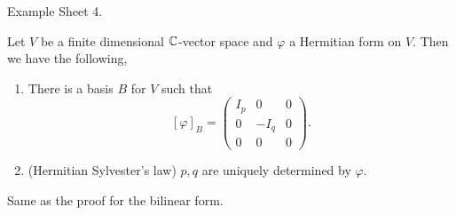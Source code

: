 \documentclass{article}
\begin{document}
\pf Example Sheet 4.
\begin{theorem}
  Let $ V $ be a finite dimensional $ \mathbb{C} $-vector space and $ \varphi $ a Hermitian form on $ V $. Then we have the following,
  \begin{enumerate}
	  \item There is a basis $ B $ for $ V $ such that
		  \[
			  [\varphi]_B=\begin{pmatrix}
				  I_p & 0 & 0 \\
				  0 & -I_q & 0 \\
				  0 & 0 & 0
			  \end{pmatrix}.
		  \]
	  \item (Hermitian Sylvester's law) $ p,q $ are uniquely determined by
		  $ \varphi $.
  \end{enumerate}
\end{theorem}
\pf Same as the proof for the bilinear form.
\end{document}
